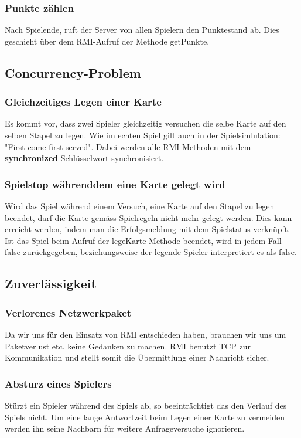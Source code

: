 \subsubsection{Punkte zählen}
Nach Spielende, ruft der Server von allen Spielern den Punktestand ab. Dies geschieht über dem RMI-Aufruf der Methode getPunkte.


\subsection{Concurrency-Problem}

\subsubsection{Gleichzeitiges Legen einer Karte}
Es kommt vor, dass zwei Spieler gleichzeitig versuchen die selbe Karte auf den selben Stapel zu legen. Wie im echten Spiel gilt auch in der Spielsimlulation: "First come first served". Dabei werden alle RMI-Methoden mit dem \textbf{synchronized}-Schlüsselwort synchronisiert.

\subsubsection{Spielstop währenddem eine Karte gelegt wird}
Wird das Spiel während einem Versuch, eine Karte auf den Stapel zu legen beendet, darf die Karte gemäss Spielregeln nicht mehr gelegt werden. Dies kann erreicht werden, indem man die Erfolgsmeldung mit dem Spielstatus verknüpft. Ist das Spiel beim Aufruf der legeKarte-Methode beendet, wird in jedem Fall false zurückgegeben, beziehungsweise der legende Spieler interpretiert es als false.

\subsection{Zuverlässigkeit}

\subsubsection{Verlorenes Netzwerkpaket}
Da wir uns für den Einsatz von RMI entschieden haben, brauchen wir uns um Paketverlust etc. keine Gedanken zu machen. RMI benutzt TCP zur Kommunikation und stellt somit die Übermittlung einer Nachricht sicher.

\subsubsection{Absturz eines Spielers}
Stürzt ein Spieler während des Spiels ab, so beeinträchtigt das den Verlauf des Spiels nicht. Um eine lange Antwortzeit beim Legen einer Karte zu vermeiden werden ihn seine Nachbarn für weitere Anfrageversuche ignorieren.

